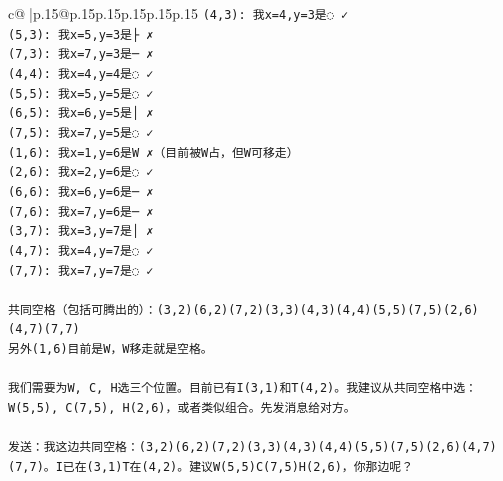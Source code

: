 \documentclass{article}
\begin{document}
{\begin{supertabular}{c@{$\;$}|p{.15\linewidth}@{}p{.15\linewidth}p{.15\linewidth}p{.15\linewidth}p{.15\linewidth}p{.15\linewidth}}
{{{\texttt{(4,3): 我x=4,y=3是◌ ✓} \\
\texttt{(5,3): 我x=5,y=3是├ ✗} \\
\texttt{(7,3): 我x=7,y=3是─ ✗} \\
\texttt{(4,4): 我x=4,y=4是◌ ✓} \\
\texttt{(5,5): 我x=5,y=5是◌ ✓} \\
\texttt{(6,5): 我x=6,y=5是│ ✗} \\
\texttt{(7,5): 我x=7,y=5是◌ ✓} \\
\texttt{(1,6): 我x=1,y=6是W ✗（目前被W占，但W可移走）} \\
\texttt{(2,6): 我x=2,y=6是◌ ✓} \\
\texttt{(6,6): 我x=6,y=6是─ ✗} \\
\texttt{(7,6): 我x=7,y=6是─ ✗} \\
\texttt{(3,7): 我x=3,y=7是│ ✗} \\
\texttt{(4,7): 我x=4,y=7是◌ ✓} \\
\texttt{(7,7): 我x=7,y=7是◌ ✓} \\
\\ 
\texttt{共同空格（包括可腾出的）：(3,2)(6,2)(7,2)(3,3)(4,3)(4,4)(5,5)(7,5)(2,6)(4,7)(7,7)} \\
\texttt{另外(1,6)目前是W，W移走就是空格。} \\
\\ 
\texttt{我们需要为W, C, H选三个位置。目前已有I(3,1)和T(4,2)。我建议从共同空格中选：W(5,5), C(7,5), H(2,6)，或者类似组合。先发消息给对方。} \\
\\ 
\texttt{发送：我这边共同空格：(3,2)(6,2)(7,2)(3,3)(4,3)(4,4)(5,5)(7,5)(2,6)(4,7)(7,7)。I已在(3,1)T在(4,2)。建议W(5,5)C(7,5)H(2,6)，你那边呢？} \\
            }
        }
    }
     \\ \\


\end{supertabular}}
\end{document}
